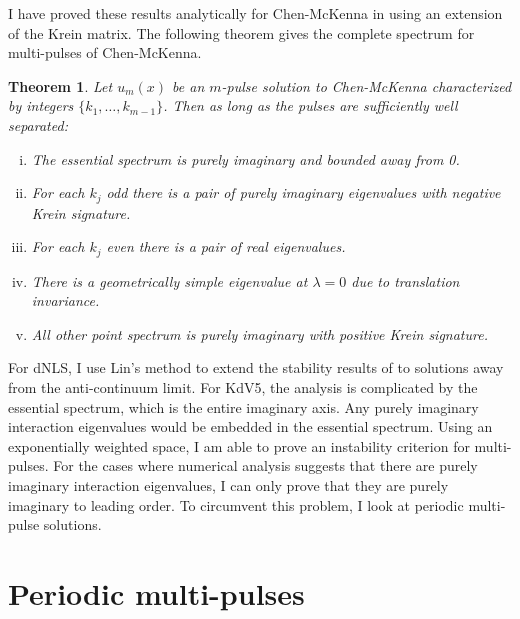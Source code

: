 \documentclass[12pt,reqno,oneside]{article}
\newtheorem{theorem}{Theorem}
\theoremstyle{definition}
\theoremstyle{remark}
\begin{document}
I have proved these results analytically for Chen-McKenna in \cite{Kap2019} using an extension of the Krein matrix. The following theorem gives the complete spectrum for multi-pulses of Chen-McKenna. 
\pagebreak
\begin{theorem}\label{Cheneigs}
Let $u_m(x)$ be an $m$-pulse solution to Chen-McKenna characterized by integers $\{ k_1, \dots, k_{m-1} \}$. Then as long as the pulses are sufficiently well separated:
\begin{enumerate}[(i)]
\item The essential spectrum is purely imaginary and bounded away from 0.
\item For each $k_j$ odd there is a pair of purely imaginary eigenvalues with negative Krein signature.
\item For each $k_j$ even there is a pair of real eigenvalues.
\item There is a geometrically simple eigenvalue at $\lambda = 0$ due to translation invariance.
\item All other point spectrum is purely imaginary with positive Krein signature.
\end{enumerate}
\end{theorem}

For dNLS, I use Lin's method to extend the stability results of \cite{Kapitula2001,Kapitula2001a} to solutions away from the anti-continuum limit. For KdV5, the analysis is complicated by the essential spectrum, which is the entire imaginary axis. Any purely imaginary interaction eigenvalues would be embedded in the essential spectrum. Using an exponentially weighted space, I am able to prove an instability criterion for multi-pulses. For the cases where numerical analysis suggests that there are purely imaginary interaction eigenvalues, I can only prove that they are purely imaginary to leading order. To circumvent this problem, I look at periodic multi-pulse solutions.

\section{Periodic multi-pulses}
\end{document}
